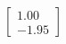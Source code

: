 \documentclass[preview]{standalone}
\begin{document}
\begin{align*}
\begin{bmatrix} 1.00 \\ -1.95 \end{bmatrix}
\end{align*}
\end{document}
